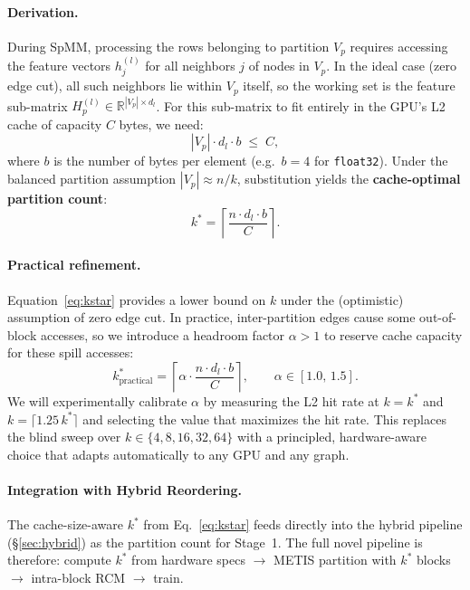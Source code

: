 \documentclass[sigconf,review]{acmart}
\begin{document}
\paragraph{Derivation.} During SpMM, processing the rows belonging to partition $V_p$ requires accessing the feature vectors $h_j^{(l)}$ for all neighbors $j$ of nodes in $V_p$. In the ideal case (zero edge cut), all such neighbors lie within $V_p$ itself, so the working set is the feature sub-matrix $H_p^{(l)} \in \mathbb{R}^{|V_p| \times d_l}$. For this sub-matrix to fit entirely in the GPU's L2 cache of capacity $C$ bytes, we need:
\begin{equation}\label{eq:cache_constraint}
    |V_p| \cdot d_l \cdot b \;\le\; C,
\end{equation}
where $b$ is the number of bytes per element (e.g.\ $b = 4$ for \texttt{float32}). Under the balanced partition assumption $|V_p| \approx n/k$, substitution yields the \textbf{cache-optimal partition count}:
\begin{equation}\label{eq:kstar}
    \boxed{\;k^* = \left\lceil \frac{n \cdot d_l \cdot b}{C} \right\rceil.\;}
\end{equation}



\paragraph{Practical refinement.}
Equation~\eqref{eq:kstar} provides a lower bound on $k$ under the (optimistic) assumption of zero edge cut. In practice, inter-partition edges cause some out-of-block accesses, so we introduce a headroom factor $\alpha > 1$ to reserve cache capacity for these spill accesses:
\begin{equation}\label{eq:kstar_practical}
    k^*_{\text{practical}} = \left\lceil \alpha \cdot \frac{n \cdot d_l \cdot b}{C} \right\rceil, \qquad \alpha \in [1.0,\, 1.5].
\end{equation}
We will experimentally calibrate $\alpha$ by measuring the L2 hit rate at $k = k^*$ and $k = \lceil 1.25\, k^* \rceil$ and selecting the value that maximizes the hit rate. This replaces the blind sweep over $k \in \{4, 8, 16, 32, 64\}$ with a principled, hardware-aware choice that adapts automatically to any GPU and any graph.

\paragraph{Integration with Hybrid Reordering.}
The cache-size-aware $k^*$ from Eq.~\eqref{eq:kstar} feeds directly into the hybrid pipeline (\S\ref{sec:hybrid}) as the partition count for Stage~1. The full novel pipeline is therefore: compute $k^*$ from hardware specs $\to$ METIS partition with $k^*$ blocks $\to$ intra-block RCM $\to$ train.
\end{document}
